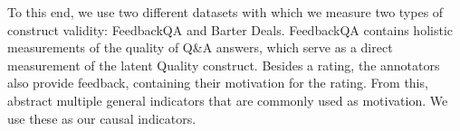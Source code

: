To this end, we use two different datasets with which we measure two types of construct validity: FeedbackQA \citep{li_using_2022} and Barter Deals. FeedbackQA contains holistic measurements of the quality of Q\&A answers, which serve as a direct measurement of the latent Quality construct. Besides a rating, the annotators also provide feedback, containing their motivation for the rating. From this, \citet{li_using_2022} abstract multiple general indicators that are commonly used as motivation. We use these as our causal indicators. 










